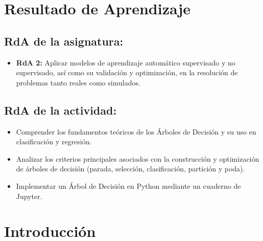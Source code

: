 \documentclass[a4,11pt]{aleph-notas}
\begin{document}
\encabezado


\section*{Resultado de Aprendizaje}

\subsection*{RdA de la asignatura:}
\begin{itemize}[leftmargin=*]
    \item \textbf{RdA 2:} 
    Aplicar modelos de aprendizaje automático supervisado y no supervisado, así como su validación y optimización, en la resolución de problemas tanto reales como simulados.
\end{itemize}

\subsection*{RdA de la actividad:}
\begin{itemize}[leftmargin=*]
    \item Comprender los fundamentos teóricos de los Árboles de Decisión y su uso en clasificación y regresión.
    \item Analizar los criterios principales asociados con la construcción y optimización de árboles de decisión (parada, selección, clasificación, partición y poda).
    \item Implementar un Árbol de Decisión en Python mediante un cuaderno de Jupyter.
\end{itemize}

\section*{Introducción}
\end{document}
